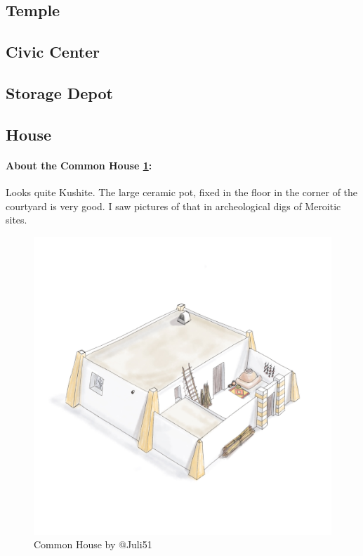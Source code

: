 \documentclass[a4paper,12pt]{scrreprt}
\begin{document}
\subsection{Temple}

\subsection{Civic Center}

\subsection{Storage Depot}

\subsection{House}

\paragraph{About the Common House \ref{fig:common_house}:} Looks quite Kushite. The large ceramic pot, fixed in the floor in the corner of the courtyard is very good. I saw pictures of that in archeological digs of Meroitic sites.

\begin{figure}[H]
	\centering
	\includegraphics[width=\textwidth]{img/house/juli51_common_house}
	\caption{Common House by @Juli51}\label{fig:common_house}
\end{figure}
\end{document}
